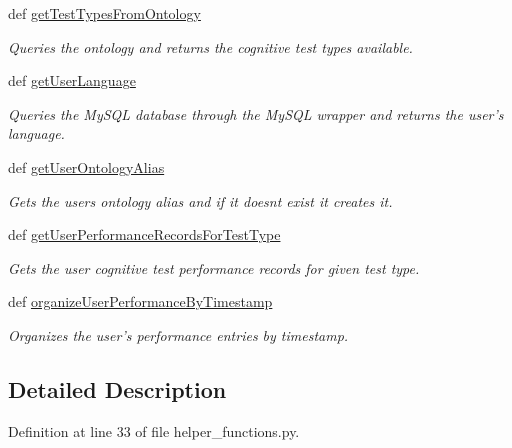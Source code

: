 \begin{DoxyCompactItemize}
def \hyperlink{classhelper__functions_1_1CognitiveExerciseHelperFunctions_afe782783345ebcf8cb2228b8379786c4}{get\-Test\-Types\-From\-Ontology}
\begin{DoxyCompactList}\small\item\em Queries the ontology and returns the cognitive test types available. \end{DoxyCompactList}\item 
def \hyperlink{classhelper__functions_1_1CognitiveExerciseHelperFunctions_a41f7e6e6342f8dc016a3bfd349f69167}{get\-User\-Language}
\begin{DoxyCompactList}\small\item\em Queries the My\-S\-Q\-L database through the My\-S\-Q\-L wrapper and returns the user's language. \end{DoxyCompactList}\item 
def \hyperlink{classhelper__functions_1_1CognitiveExerciseHelperFunctions_a4165e639bb258e4ff0b7954d8596b96d}{get\-User\-Ontology\-Alias}
\begin{DoxyCompactList}\small\item\em Gets the users ontology alias and if it doesnt exist it creates it. \end{DoxyCompactList}\item 
def \hyperlink{classhelper__functions_1_1CognitiveExerciseHelperFunctions_a22a95ff40ea4c5de8751484dca12d425}{get\-User\-Performance\-Records\-For\-Test\-Type}
\begin{DoxyCompactList}\small\item\em Gets the user cognitive test performance records for given test type. \end{DoxyCompactList}\item 
def \hyperlink{classhelper__functions_1_1CognitiveExerciseHelperFunctions_a60d24a04497455fdbf8d12a3d968de4b}{organize\-User\-Performance\-By\-Timestamp}
\begin{DoxyCompactList}\small\item\em Organizes the user's performance entries by timestamp. \end{DoxyCompactList}\end{DoxyCompactItemize}


\subsection{Detailed Description}


Definition at line 33 of file helper\-\_\-functions.\-py.



